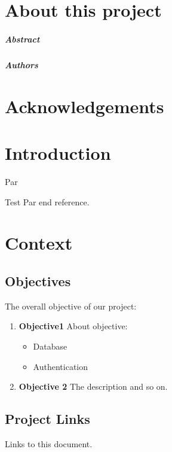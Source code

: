 
\chapter*{About this project}

\paragraph{Abstract}


\paragraph{Authors}


\chapter*{Acknowledgements}


\chapter{Introduction}
\par Par

\par Test Par end reference\cite{NameOfreff}.

\chapter{Context}

\section{Objectives}
The overall objective of our project:

\begin{enumerate}
    \item \textbf{Objective1} About objective:
    \begin{itemize}
        \item Database 
        \item Authentication 
    \end{itemize}
    \item \textbf{Objective 2} The description and so on.
\end{enumerate}

\section{Project Links}
Links to this document.

